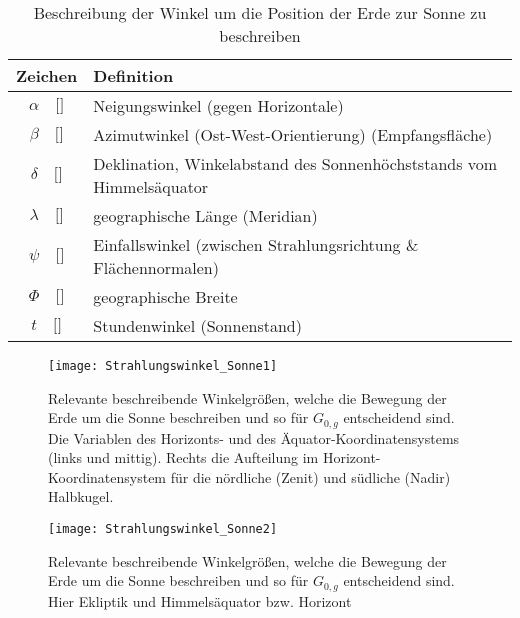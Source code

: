 	
	\begin{table}[h]
		\begin{tabular}{|c|l|} %
			\hline 
			Zeichen & Definition \\ 
			\hline 
			$\alpha \quad[$\degree$] $ & Neigungswinkel (gegen Horizontale)  \\ 
			\hline 
			$\beta \quad [$\degree$] $ & Azimutwinkel (Ost-West-Orientierung) (Empfangsfläche) \\ 
			\hline 
			$\delta \quad [$\degree$] $ & Deklination, Winkelabstand des Sonnenhöchststands vom Himmelsäquator  \\ 
			\hline 
			$\lambda \quad [$\degree$] $ & geographische Länge (Meridian)  \\ 
			\hline
			$\psi \quad [$\degree$] $ & Einfallswinkel (zwischen Strahlungsrichtung \& Flächennormalen)  \\ 
			\hline 
			$\Phi \quad [$\degree$] $ & geographische Breite  \\ 
			\hline 
			$t \quad [$\degree$] $ & Stundenwinkel (Sonnenstand) \\ 
			\hline 
		\end{tabular} 
		\caption{Beschreibung der Winkel um die Position der Erde zur Sonne zu beschreiben}
		\label{Tab:sonnenwinkel}
	\end{table}

\begin{landscape}
	\begin{figure}[h]
		\centering
		\texttt{[image: Strahlungswinkel\_Sonne1]}
		\caption{Relevante beschreibende Winkelgrößen, welche die Bewegung der Erde um die Sonne beschreiben und so für $G_{0,g}$ entscheidend sind. Die Variablen des Horizonts- und des Äquator-Koordinatensystems (links und mittig). Rechts die Aufteilung im Horizont-Koordinatensystem für die nördliche (Zenit) und südliche (Nadir) Halbkugel.\cite{REN2}}
		\label{Abb:sonnenwinkel1}
	\end{figure}
	
	\begin{figure}[h]
		\centering
		\texttt{[image: Strahlungswinkel\_Sonne2]}
		\caption{Relevante beschreibende Winkelgrößen, welche die Bewegung der Erde um die Sonne beschreiben und so für $G_{0,g}$ entscheidend sind. Hier Ekliptik und Himmelsäquator bzw. Horizont \cite{REN2}}
		\label{Abb:sonnenwinkel2}
	\end{figure}
\end{landscape}
        